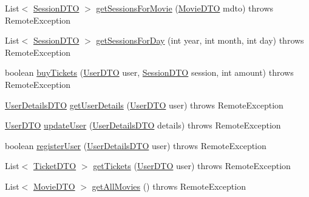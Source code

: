 \begin{DoxyCompactItemize}
List$<$ \mbox{\hyperlink{classes_1_1deusto_1_1server_1_1data_1_1_session_d_t_o}{Session\+D\+TO}} $>$ \mbox{\hyperlink{classes_1_1deusto_1_1server_1_1_server_a33a6671bb4dc4bd9e23df10e53e5632d}{get\+Sessions\+For\+Movie}} (\mbox{\hyperlink{classes_1_1deusto_1_1server_1_1data_1_1_movie_d_t_o}{Movie\+D\+TO}} mdto)  throws Remote\+Exception 
\item 
List$<$ \mbox{\hyperlink{classes_1_1deusto_1_1server_1_1data_1_1_session_d_t_o}{Session\+D\+TO}} $>$ \mbox{\hyperlink{classes_1_1deusto_1_1server_1_1_server_a688ca336b3cbdb5c04ecdc4f23ff65d1}{get\+Sessions\+For\+Day}} (int year, int month, int day)  throws Remote\+Exception 
\item 
boolean \mbox{\hyperlink{classes_1_1deusto_1_1server_1_1_server_a3bbf9f19774d2fae5c831cfac1f2306c}{buy\+Tickets}} (\mbox{\hyperlink{classes_1_1deusto_1_1server_1_1data_1_1_user_d_t_o}{User\+D\+TO}} user, \mbox{\hyperlink{classes_1_1deusto_1_1server_1_1data_1_1_session_d_t_o}{Session\+D\+TO}} session, int amount)  throws Remote\+Exception 
\item 
\mbox{\hyperlink{classes_1_1deusto_1_1server_1_1data_1_1_user_details_d_t_o}{User\+Details\+D\+TO}} \mbox{\hyperlink{classes_1_1deusto_1_1server_1_1_server_ad742fe9a45edccd8b2309be98a74baae}{get\+User\+Details}} (\mbox{\hyperlink{classes_1_1deusto_1_1server_1_1data_1_1_user_d_t_o}{User\+D\+TO}} user)  throws Remote\+Exception 
\item 
\mbox{\hyperlink{classes_1_1deusto_1_1server_1_1data_1_1_user_d_t_o}{User\+D\+TO}} \mbox{\hyperlink{classes_1_1deusto_1_1server_1_1_server_a74082f91af2065cd600c147296090921}{update\+User}} (\mbox{\hyperlink{classes_1_1deusto_1_1server_1_1data_1_1_user_details_d_t_o}{User\+Details\+D\+TO}} details)  throws Remote\+Exception 
\item 
boolean \mbox{\hyperlink{classes_1_1deusto_1_1server_1_1_server_a6a419bd82bce60f072b4c7f5a527abdc}{register\+User}} (\mbox{\hyperlink{classes_1_1deusto_1_1server_1_1data_1_1_user_details_d_t_o}{User\+Details\+D\+TO}} user)  throws Remote\+Exception 
\item 
List$<$ \mbox{\hyperlink{classes_1_1deusto_1_1server_1_1data_1_1_ticket_d_t_o}{Ticket\+D\+TO}} $>$ \mbox{\hyperlink{classes_1_1deusto_1_1server_1_1_server_ac46819596621f54e4c083d7ea49e3ff0}{get\+Tickets}} (\mbox{\hyperlink{classes_1_1deusto_1_1server_1_1data_1_1_user_d_t_o}{User\+D\+TO}} user)  throws Remote\+Exception 
\item 
List$<$ \mbox{\hyperlink{classes_1_1deusto_1_1server_1_1data_1_1_movie_d_t_o}{Movie\+D\+TO}} $>$ \mbox{\hyperlink{classes_1_1deusto_1_1server_1_1_server_a12879447707ea74459bfed6fffab514b}{get\+All\+Movies}} ()  throws Remote\+Exception 

\end{DoxyCompactItemize}
